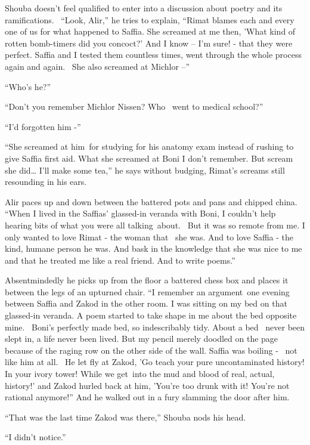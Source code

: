 \documentclass[twoside,11pt]{book}
\begin{document}
Shouba doesn't feel qualified to enter into a discussion about poetry and its{ }ramifications.
\ {}``Look, Alir,'' he tries to explain, ``Rimat blames each and every one of us for what
happened to Saffia. She screamed at me then, 'What kind of rotten bomb-timers did you concoct?' And I know -- I'm sure!
- that they were perfect. Saffia and I tested them countless times, went through the whole process again and again.
~She also screamed at Michlor --''

``Who's he?''

``Don't you remember Michlor Nissen? Who \ went to medical school?''

``I'd forgotten him -''

``She screamed at him~for studying for his anatomy exam instead of rushing to give Saffia first aid. What
she screamed at Boni I don't remember. But scream she did{\dots} I'll make some tea,'' he says without
budging, Rimat's screams still resounding in his ears.

Alir paces up and down between the battered pots and pans and chipped china. ``When I lived in the Saffias'
glassed-in veranda with Boni, I couldn't help hearing bits of what you were all talking~about.~ But it was so remote
from me. I only wanted to love Rimat - the woman that \ she was. And to love Saffia - the kind, humane person he was.
And bask in the knowledge that she was nice to me and that he treated me like a real friend. And to write
poems.''

Absentmindedly he picks up from the floor a battered chess box and places it between the legs of an upturned chair.
``I remember an argument~one evening between Saffia and Zakod in the other room. I was sitting on my bed
on that glassed-in veranda. A poem started to take shape in me about the bed opposite mine.~ Boni's perfectly made bed,
so indescribably tidy. About a bed \ never been slept in, a life never been lived. But my pencil merely doodled on the
page because of the raging row on the other side of the wall. Saffia was boiling - \ not like him at all. \ He let fly
at Zakod, 'Go teach your pure uncontaminated history! In your ivory tower! While we get~into the mud and blood of real,
actual, history!' and Zakod hurled back at him, 'You're too drunk with it! You're not rational anymore!''
And he walked out in a fury slamming the door after him.

``That was the last time Zakod was there,'' Shouba nods his head.

``I didn't notice.''
\end{document}
